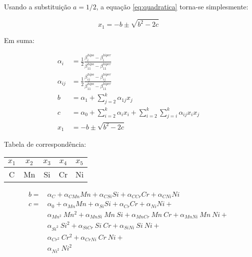\documentclass{article}
\begin{document}
Usando a substituição $a = 1/2$, a equação \ref{eq:quadratica} torna-se simplesmente:

\begin{equation}
	x_1 = -b \pm \sqrt{b^2 - 2 c}
	\label{eq:quadratica_2}
\end{equation}


Em suma:

\begin{align*}
	\alpha_i &= \frac{1}{2} \frac{\beta_i^{hipo} - \beta_i^{hiper}}{\beta_{11}^{hipo} - \beta_{11}^{hiper}}\\
	\alpha_{ij} &= \frac{1}{2} \frac{\beta_{ij}^{hipo} - \beta_{ij}^{hiper}}{\beta_{11}^{hipo} - \beta_{11}^{hiper}}\\
	b &= \alpha_1 + \sum_{j=2}^k \alpha_{1j} x_j \\
	c &= \alpha_0 
	+ \sum_{i=2}^k \alpha_i x_i 
	+ \sum_{i=2}^{k} \sum_{j=i}^k \alpha_{ij} x_i x_j \\
	x_1 &= -b \pm \sqrt{b^2 - 2 c}
\end{align*}

\pagebreak

Tabela de correspondência:

\begin{table}[ht]
	\centering
	\begin{tabular}{c c c c c}
	\hline
	$x_1$ & $x_2$ & $x_3$ & $x_4$ & $x_5$ \\
	\hline
	C & Mn & Si & Cr & Ni \\
	\hline
	\end{tabular}
\end{table}

\begin{align}
	b =&\,\alpha_{C} + \alpha_{C Mn} Mn + \alpha_{C Si} Si + \alpha_{C Cr} Cr + \alpha_{C Ni} Ni\\
	c =&\,\alpha_0 + \alpha_{Mn} Mn + \alpha_{Si} Si + \alpha_{Cr} Cr + \alpha_{Ni} Ni + \nonumber \\
	   &\,\alpha_{Mn^2}\ Mn^2 + \alpha_{Mn Si}\ Mn\ Si + \alpha_{Mn Cr}\ Mn\ Cr + \alpha_{Mn Ni}\ Mn\ Ni + \nonumber \\
	   &\,\alpha_{Si^2}\ Si^2 + \alpha_{Si Cr}\ Si\ Cr + \alpha_{Si Ni}\ Si\ Ni + \nonumber \\
	   &\,\alpha_{Cr^2}\ Cr^2 + \alpha_{Cr Ni}\ Cr\ Ni + \nonumber \\
	   &\,\alpha_{Ni^2}\ Ni^2
\end{align}
\end{document}
